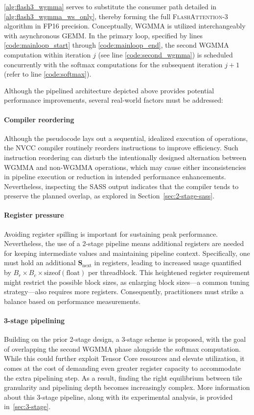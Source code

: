 \cref{alg:flash3_wgmma} serves to substitute the consumer path detailed in \cref{alg:flash3_wgmma_ws_only}, thereby forming the full \textsc{FlashAttention-3} algorithm in FP16 precision. Conceptually, WGMMA is utilized interchangeably with asynchronous GEMM. In the primary loop, specified by lines \ref{code:mainloop_start} through \ref{code:mainloop_end}, the second WGMMA computation within iteration $j$ (see line \ref{code:second_wgmma}) is scheduled concurrently with the softmax computations for the subsequent iteration $j+1$ (refer to line \ref{code:softmax}).

Although the pipelined architecture depicted above provides potential performance improvements, several real-world factors must be addressed:
\paragraph{Compiler reordering} Although the pseudocode lays out a sequential, idealized execution of operations, the NVCC compiler routinely reorders instructions to improve efficiency. Such instruction reordering can disturb the intentionally designed alternation between WGMMA and non-WGMMA operations, which may cause either inconsistencies in pipeline execution or reduction in intended performance enhancements. Nevertheless, inspecting the SASS output indicates that the compiler tends to preserve the planned overlap, as explored in Section~\ref{sec:2-stage-sass}.
\paragraph{Register pressure} Avoiding register spilling is important for sustaining peak performance. Nevertheless, the use of a 2-stage pipeline means additional registers are needed for keeping intermediate values and maintaining pipeline context. Specifically, one must hold an additional $\mathbf{S}_{\mathrm{next}}$ in registers, leading to increased usage quantified by $B_r \times B_c \times \text{sizeof}(\text{float})$ per threadblock. This heightened register requirement might restrict the possible block sizes, as enlarging block sizes—a common tuning strategy—also requires more registers. Consequently, practitioners must strike a balance based on performance measurements.
\paragraph{3-stage pipelining} Building on the prior 2-stage design, a 3-stage scheme is proposed, with the goal of overlapping the second WGMMA phase alongside the softmax computation. While this could further exploit Tensor Core resources and elevate utilization, it comes at the cost of demanding even greater register capacity to accommodate the extra pipelining step. As a result, finding the right equilibrium between tile granularity and pipelining depth becomes increasingly complex. More information about this 3-stage pipeline, along with its experimental analysis, is provided in~\cref{sec:3-stage}.

